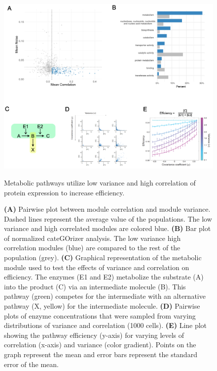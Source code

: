 \begin{figure}[hbt!]
\centering
\includegraphics[width=15cm, keepaspectratio]{figs/paper2/fig4.png}
\caption{Metabolic pathways utilize low variance and high correlation of protein expression to increase efficiency.}
\caption*{\textbf{(A)} Pairwise plot between module correlation and module variance. Dashed lines represent the average value of the populations. The low variance and high correlated modules are colored blue. \textbf{(B)} Bar plot of normalized cateGOrizer analysis. The low variance high correlation modules (blue) are compared to the rest of the population (grey). \textbf{(C)} Graphical representation of the metabolic module used to test the effects of variance and correlation on efficiency. The enzymes (E1 and E2) metabolize the substrate (A) into the product (C) via an intermediate molecule (B). This pathway (green) competes for the intermediate with an alternative pathway (X, yellow) for the intermediate molecule. \textbf{(D)} Pairwise plots of enzyme concentrations that were sampled from varying distributions of variance and correlation (1000 cells). \textbf{(E)} Line plot showing the pathway efficiency (y-axis) for varying levels of correlation (x-axis) and variance (color gradient). Points on the graph represent the mean and error bars represent the standard error of the mean.}
\label{fig:paper2_fig4}
\end{figure}

